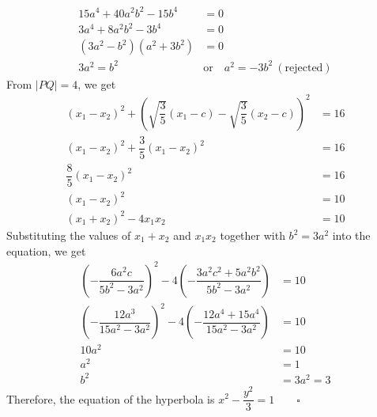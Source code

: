 \documentclass{report}
\newcommand{\eos}{ \qquad \square}
\begin{document}
\begin{enumerate}
\begin{align*}
              15a^4 + 40a^2b^2 - 15b^4                                                                                          & = 0                                            \\
              3a^4 + 8a^2b^2 - 3b^4                                                                                             & = 0                                            \\
              (3a^2 - b^2)(a^2 + 3b^2)                                                                                          & = 0                                            \\
              3a^2 = b^2 \quad                                                                                                  & \text{or} \quad a^2 = -3b^2\ (\text{rejected})
          \end{align*}
          From $|PQ|=4$, we get
          \begin{align*}
              (x_1 - x_2)^2 + \left(\sqrt{\dfrac{3}{5}}(x_1 - c) - \sqrt{\dfrac{3}{5}}(x_2 - c)\right)^2 & = 16 \\
              (x_1 - x_2)^2 + \dfrac{3}{5}(x_1 - x_2)^2                                                  & = 16 \\
              \dfrac{8}{5}(x_1 - x_2)^2                                                                  & = 16 \\
              (x_1 - x_2)^2                                                                              & = 10 \\
              (x_1 + x_2)^2 - 4x_1x_2                                                                    & = 10
          \end{align*}
          Substituting the values of $x_1 + x_2$ and $x_1x_2$ together with $b^2 = 3a^2$ into the equation, we get
          \begin{align*}
              \left(-\dfrac{6a^2c}{5b^2 - 3a^2}\right)^2 - 4\left(-\dfrac{3a^2c^2 + 5a^2b^2}{5b^2 - 3a^2}\right) & = 10       \\
              \left(-\dfrac{12a^3}{15a^2 - 3a^2}\right)^2 - 4\left(-\dfrac{12a^4 + 15a^4}{15a^2 - 3a^2}\right)   & = 10       \\
              10a^2                                                                                              & = 10       \\
              a^2                                                                                                & = 1        \\
              b^2                                                                                                & = 3a^2 = 3
          \end{align*}
          Therefore, the equation of the hyperbola is $x^2 - \dfrac{y^2}{3} = 1 \eos$
\end{enumerate}
\end{document}
